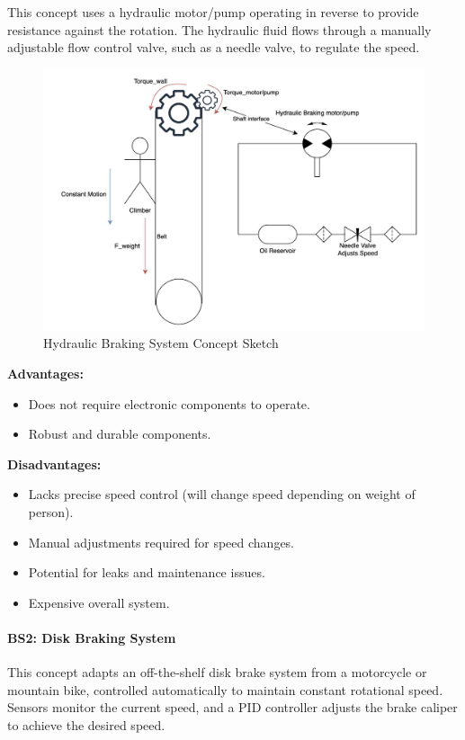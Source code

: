 This concept uses a hydraulic motor/pump operating in reverse to provide resistance against the rotation. The hydraulic fluid flows through a manually adjustable flow control valve, such as a needle valve, to regulate the speed.

\begin{figure}[H]
    \centering
    \includegraphics[width=0.6\linewidth]{figs/concept_design/hydraulic_brake_concept.png}
    \caption{Hydraulic Braking System Concept Sketch}
    \label{fig:hydraulic-brake-concept}
\end{figure}

\textbf{Advantages:}
\begin{itemize}
    \item Does not require electronic components to operate.
    \item Robust and durable components.
\end{itemize}

\textbf{Disadvantages:}
\begin{itemize}
    \item Lacks precise speed control (will change speed depending on weight of person).
    \item Manual adjustments required for speed changes.
    \item Potential for leaks and maintenance issues.
    \item Expensive overall system.
\end{itemize}

\paragraph{BS2: Disk Braking System}

This concept adapts an off-the-shelf disk brake system from a motorcycle or mountain bike, controlled automatically to maintain constant rotational speed. Sensors monitor the current speed, and a PID controller adjusts the brake caliper to achieve the desired speed.

